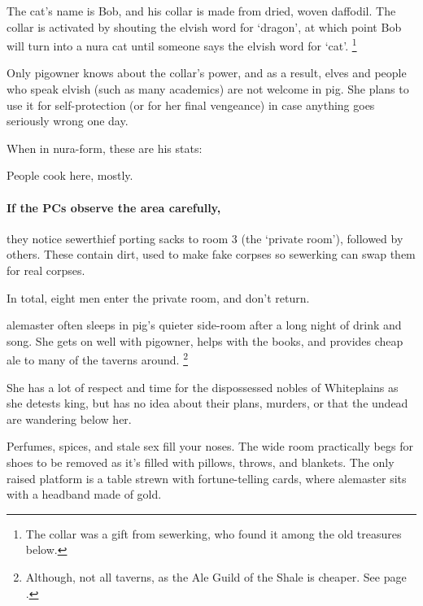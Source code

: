The cat's name is Bob, and his collar is made from dried, woven daffodil.  The collar is activated by shouting the elvish word for `dragon', at which point Bob will turn into a nura cat until someone says the elvish word for `cat'.%
\footnote{The collar was a gift from \gls{sewerking}, who found it among the old treasures below.}

Only \gls{pigowner} knows about the collar's power, and as a result, elves and people who speak elvish (such as many academics) are not welcome in \gls{pig}.
She plans to use it for self-protection (or for her final vengeance) in case anything goes seriously wrong one day.

When in nura-form, these are his stats:



People cook here, mostly.

\paragraph{If the PCs observe the area carefully,}
they notice \gls{sewerthief} porting sacks to room 3 (the `private room'), followed by others.
These contain dirt, used to make fake corpses so \gls{sewerking} can swap them for real corpses.

In total, eight men enter the private room, and don't return.

\pigowner


\Gls{alemaster} often sleeps in \gls{pig}'s quieter side-room after a long night of drink and song.
She gets on well with \gls{pigowner}, helps with the books, and provides cheap ale to many of the taverns around.%
\footnote{Although, not all taverns, as the Ale Guild of the Shale is cheaper.
See page \pageref{troubleAle}.}

She has a lot of respect and time for the dispossessed nobles of Whiteplains as she detests \gls{king}, but has no idea about their plans, murders, or that the undead are wandering below her.

\begin{boxtext}

  Perfumes, spices, and stale sex fill your noses.
  The wide room practically begs for shoes to be removed as it's filled with pillows, throws, and blankets.
  The only raised platform is a table strewn with fortune-telling cards, where \gls{alemaster} sits with a headband made of gold.

\end{boxtext}

